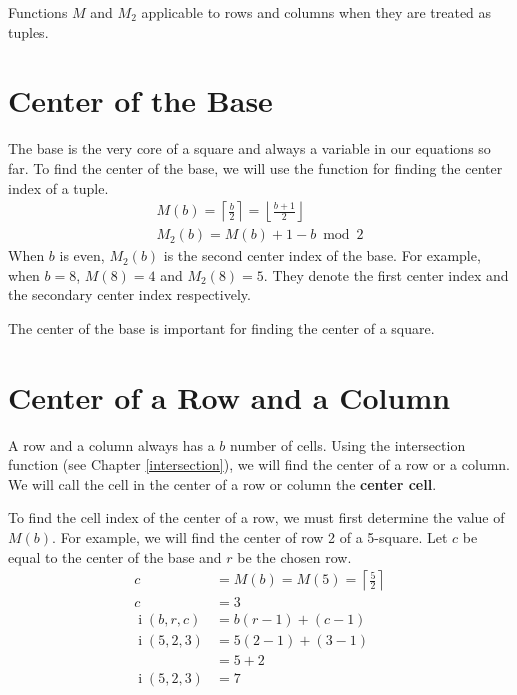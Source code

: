 \documentclass[twoside,openany,12pt]{book}
\begin{document}
    Functions $M$ and $M_2$ applicable to rows and columns when they are treated as tuples.

    \section{Center of the Base} \label{center_base}
    The base is the very core of a square and always a variable in our equations so far. To find the center of the base, we will use the function for finding the center index of a tuple.
    \begin{equation}
        \begin{split}
            M(b) = \left\lceil \frac{b}{2} \right\rceil = \left\lfloor \frac{b+1}{2} \right\rfloor \\
            M_{2}(b) = M(b) + 1 - b\bmod 2
        \end{split}
    \end{equation}
    When $b$ is even, $M_{2}(b)$ is the second center index of the base. For example, when $b = 8$, $M(8) = 4$ and $M_{2}(8) = 5$. They denote the first center index and the secondary center index respectively.


    The center of the base is important for finding the center of a square.

    \section{Center of a Row and a Column} \label{center_row_column}
    A row and a column always has a $b$ number of cells. Using the intersection function (see Chapter \ref{intersection}), we will find the center of a row or a column. We will call the cell in the center of a row or column the \textbf{center cell}.

    To find the cell index of the center of a row, we must first determine the value of $M(b)$. For example, we will find the center of row 2 of a 5-square. Let $c$ be equal to the center of the base and $r$ be the chosen row. 
    \begin{equation}
        \begin{split}
            c &= M(b) = M(5) = \left\lceil \frac{5}{2} \right\rceil \\
            c &= 3 \\
            \operatorname{i}(b,r,c) &= b(r-1)+(c-1) \\
            \operatorname{i}(5,2,3) &= 5(2-1)+(3-1) \\
                &= 5 + 2 \\
            \operatorname{i}(5,2,3) &= 7 \\
        \end{split}
    \end{equation}
\end{document}
